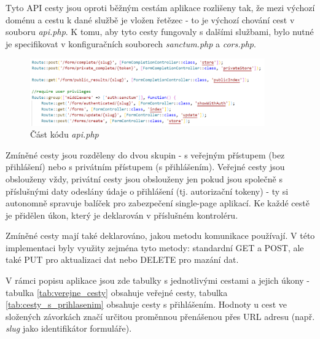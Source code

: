 	Tyto API cesty jsou oproti běžným cestám aplikace rozlišeny tak, že mezi výchozí doménu a cestu k dané službě je vložen řetězec \textit{} - to je výchozí chování cest v souboru \textit{api.php}. K tomu, aby tyto cesty fungovaly s dalšími službami, bylo nutné je specifikovat v konfiguračních souborech \textit{sanctum.php} a \textit{cors.php}.
	
	\begin{figure}[H]
		\centering %
		\includegraphics[width=0.9\textwidth]{img/routes/api_routes.png} %
		\caption{Část kódu \textit{api.php}} %
		\label{fig:routes_api} %
	\end{figure}
	
	Zmíněné cesty jsou rozděleny do dvou skupin - s veřejným přístupem (bez přihlášení) nebo s privátním přístupem (s přihlášením). Veřejné cesty jsou obslouženy vždy, privátní cesty jsou obslouženy jen pokud jsou společně s příslušnými daty odeslány údaje o přihlášení (tj. autorizační tokeny) - ty si autonomně spravuje balíček  pro zabezpečení single-page aplikací. Ke každé cestě je přidělen úkon, který je deklarován v příslušném kontroléru. 
	
	Zmíněné cesty mají také deklarováno, jakou metodu komunikace používají. V této implementaci byly využity zejména tyto metody: standardní GET a POST, ale také PUT pro aktualizaci dat nebo DELETE pro mazání dat.
	
	V rámci popisu aplikace jsou zde tabulky s jednotlivými cestami a jejich úkony - tabulka \ref{tab:verejne_cesty} obsahuje veřejné cesty, tabulka \ref{tab:cesty_s_prihlasenim} obsahuje cesty s přihlášením. Hodnoty u cest ve složených závorkách značí určitou proměnnou přenášenou přes URL adresu (např. \textit{slug} jako identifikátor formuláře).
	
